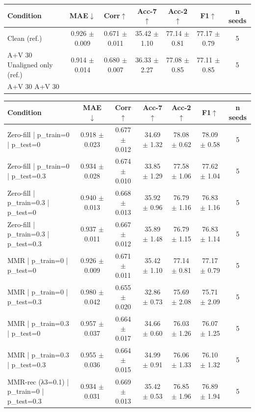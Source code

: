\begin{tabular}{lcccccc}
\hline
Condition & MAE$\downarrow$ & Corr$\uparrow$ & Acc-7$\uparrow$ & Acc-2$\uparrow$ & F1$\uparrow$ & n seeds \\
\hline
Clean (ref.) & 0.926 $\pm$ 0.009 & 0.671 $\pm$ 0.011 & 35.42 $\pm$ 1.10 & 77.14 $\pm$ 0.81 & 77.17 $\pm$ 0.79 & 5 \\
A+V 30%
Unaligned only (ref.) & 0.914 $\pm$ 0.014 & 0.680 $\pm$ 0.007 & 36.33 $\pm$ 2.27 & 77.08 $\pm$ 0.85 & 77.11 $\pm$ 0.85 & 5 \\
A+V 30%
A+V 30%
\hline
\end{tabular}


\begin{tabular}{lcccccc}
\hline
Condition & MAE$\downarrow$ & Corr$\uparrow$ & Acc-7$\uparrow$ & Acc-2$\uparrow$ & F1$\uparrow$ & n seeds \\
\hline
Zero-fill | p_train=0 | p_test=0 & 0.918 $\pm$ 0.023 & 0.677 $\pm$ 0.012 & 34.69 $\pm$ 1.32 & 78.08 $\pm$ 0.62 & 78.09 $\pm$ 0.58 & 5 \\
Zero-fill | p_train=0 | p_test=0.3 & 0.934 $\pm$ 0.028 & 0.674 $\pm$ 0.010 & 33.85 $\pm$ 1.29 & 77.58 $\pm$ 1.06 & 77.62 $\pm$ 1.04 & 5 \\
Zero-fill | p_train=0.3 | p_test=0 & 0.940 $\pm$ 0.013 & 0.668 $\pm$ 0.013 & 35.92 $\pm$ 0.96 & 76.79 $\pm$ 1.16 & 76.83 $\pm$ 1.16 & 5 \\
Zero-fill | p_train=0.3 | p_test=0.3 & 0.937 $\pm$ 0.011 & 0.667 $\pm$ 0.012 & 35.89 $\pm$ 1.48 & 76.79 $\pm$ 1.15 & 76.83 $\pm$ 1.14 & 5 \\
MMR | p_train=0 | p_test=0 & 0.926 $\pm$ 0.009 & 0.671 $\pm$ 0.011 & 35.42 $\pm$ 1.10 & 77.14 $\pm$ 0.81 & 77.17 $\pm$ 0.79 & 5 \\
MMR | p_train=0 | p_test=0.3 & 0.980 $\pm$ 0.042 & 0.655 $\pm$ 0.020 & 32.86 $\pm$ 0.73 & 75.69 $\pm$ 2.08 & 75.71 $\pm$ 2.09 & 5 \\
MMR | p_train=0.3 | p_test=0 & 0.957 $\pm$ 0.037 & 0.664 $\pm$ 0.017 & 34.66 $\pm$ 0.60 & 76.03 $\pm$ 1.26 & 76.07 $\pm$ 1.25 & 5 \\
MMR | p_train=0.3 | p_test=0.3 & 0.955 $\pm$ 0.036 & 0.664 $\pm$ 0.015 & 34.99 $\pm$ 0.91 & 76.06 $\pm$ 1.33 & 76.10 $\pm$ 1.32 & 5 \\
MMR-rec (λ3=0.1) | p_train=0 | p_test=0.3 & 0.934 $\pm$ 0.031 & 0.669 $\pm$ 0.013 & 35.42 $\pm$ 0.53 & 76.85 $\pm$ 1.96 & 76.89 $\pm$ 1.94 & 5 \\
\hline
\end{tabular}


